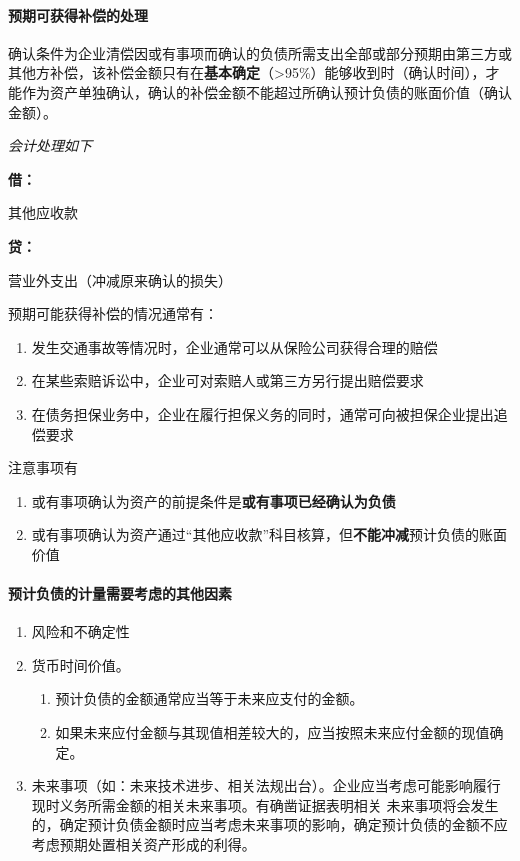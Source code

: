 \documentclass[UTF8,12pt]{ctexart}
\newenvironment{Dr}{%
	\begin{list}{}%
		{
			\setlength{\leftmargin}{2em}
			\setlength{\labelwidth}{2em}
			\setlength{\labelsep}{0pt}
			\setlength{\itemindent}{0pt}
			\setlength{\listparindent}{0pt}
			\setlength{\parsep}{0pt}
			\setlength{\topsep}{0pt}
		}
		\item[\textbf{借：}]
	}{%
	\end{list}
}
\newenvironment{Cr}{%
	\begin{list}{}%
		{
			\setlength{\leftmargin}{2em}
			\setlength{\labelwidth}{2em}
			\setlength{\labelsep}{0pt}
			\setlength{\itemindent}{0pt}
			\setlength{\listparindent}{0pt}
			\setlength{\parsep}{0pt}
			\setlength{\topsep}{0pt}
		}
		\item[\textbf{贷：}]
	}{%
	\end{list}
}
\numberwithin{equation}{section} %
\numberwithin{figure}{section}
\numberwithin{table}{section}
\begin{document}
	
	\paragraph{预期可获得补偿的处理}
	确认条件为企业清偿因或有事项而确认的负债所需支出全部或部分预期由第三方或其他方补偿，该补偿金额只有在\textbf{基本确定}（>95\%）能够收到时（确认时间），才能作为资产单独确认，确认的补偿金额不能超过所确认预计负债的账面价值（确认金额）。
	
	\textit{会计处理如下}
	
	\begin{Dr}
		其他应收款
	\end{Dr}
	\begin{Cr}
		营业外支出（冲减原来确认的损失）
	\end{Cr}
	
	预期可能获得补偿的情况通常有：
	\begin{enumerate}
		\item 发生交通事故等情况时，企业通常可以从保险公司获得合理的赔偿
		
		\item 在某些索赔诉讼中，企业可对索赔人或第三方另行提出赔偿要求
		
		\item 在债务担保业务中，企业在履行担保义务的同时，通常可向被担保企业提出追偿要求
	\end{enumerate}
	
	注意事项有
	\begin{enumerate}
		\item 或有事项确认为资产的前提条件是\textbf{或有事项已经确认为负债}
		
		\item 或有事项确认为资产通过“其他应收款”科目核算，但\textbf{不能冲减}预计负债的账面价值
	\end{enumerate}
	
	\paragraph{预计负债的计量需要考虑的其他因素}
	\begin{enumerate}
		\item 风险和不确定性
		
		\item 货币时间价值。
		\begin{enumerate}
			\item 预计负债的金额通常应当等于未来应支付的金额。
			
			\item 如果未来应付金额与其现值相差较大的，应当按照未来应付金额的现值确定。
		\end{enumerate}
		
		\item 未来事项（如：未来技术进步、相关法规出台）。企业应当考虑可能影响履行现时义务所需金额的相关未来事项。有确凿证据表明相关  未来事项将会发生的，确定预计负债金额时应当考虑未来事项的影响，确定预计负债的金额不应考虑预期处置相关资产形成的利得。
	\end{enumerate}
	
\end{document}
